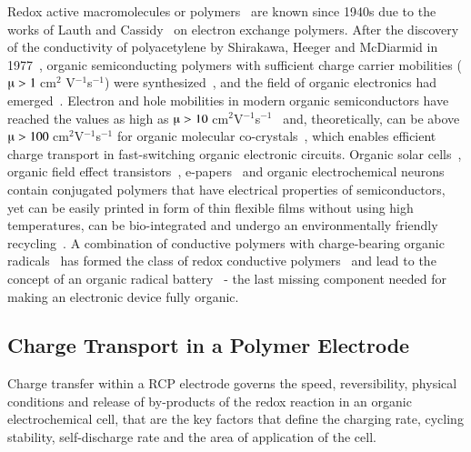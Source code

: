 Redox active macromolecules or polymers~\cite{Staudinger_1920} are known since 1940s due to the works of Lauth and Cassidy~\cite{Cassidy_1949} on electron exchange polymers. After the discovery of the conductivity of polyacetylene by Shirakawa, Heeger and McDiarmid in 1977~\cite{Shirakawa_1977}, organic semiconducting polymers with sufficient charge carrier mobilities ($\muup>1~$cm$^2$ V$^{-1}$s$^{-1}$) were synthesized~\cite{Hu2021}, and the field of organic electronics had emerged~\cite{heeger_polymers,Casado_2021_book}. Electron and hole mobilities in modern organic semiconductors have reached the values as high as $\muup>10~$cm$^2$V$^{-1}$s$^{-1}$~\cite{Hu2021} and, theoretically, can be above $\muup>100~$cm$^2$V$^{-1}$s$^{-1}$ for organic molecular co-crystals~\cite{Zhu2012}, which enables efficient charge transport in fast-switching organic electronic circuits. Organic solar cells~\cite{Lee_1993}, organic field effect transistors~\cite{Koezuka_1987,Yan2009}, e-papers~\cite{Hu2021} and organic electrochemical neurons~\cite{Harikesh2022} contain conjugated polymers that have electrical properties of semiconductors, yet can be easily printed in form of thin flexible films without using high temperatures, can be bio-integrated and undergo an environmentally friendly recycling~\cite{nishide_2009}. A combination of conductive polymers with charge-bearing organic radicals~\cite{IWASA2007} has formed the class of redox conductive polymers~\cite{Casado_2021_book} and lead to the concept of an organic radical battery~\cite{Rohland_2021,nishide2004_electact,nakahara2002_cpl,Xie2021} - the last missing component needed for making an electronic device fully organic.\\



\subsection{Charge Transport in a Polymer Electrode}  

\par
Charge transfer within a RCP electrode governs the speed, reversibility, physical conditions and release of by-products of the redox reaction in an organic electrochemical cell, that are the key factors that define the charging rate, cycling stability, self-discharge rate and the area of application of the cell.\\


